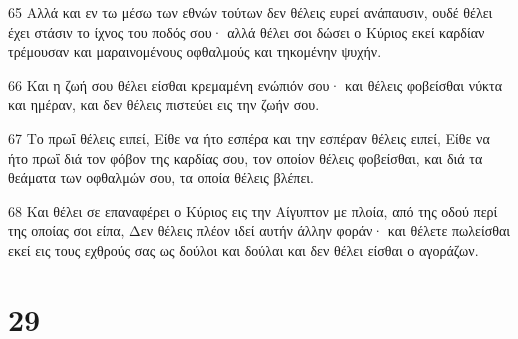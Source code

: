 \par 65 Αλλά και εν τω μέσω των εθνών τούτων δεν θέλεις ευρεί ανάπαυσιν, ουδέ θέλει έχει στάσιν το ίχνος του ποδός σου· αλλά θέλει σοι δώσει ο Κύριος εκεί καρδίαν τρέμουσαν και μαραινομένους οφθαλμούς και τηκομένην ψυχήν.
\par 66 Και η ζωή σου θέλει είσθαι κρεμαμένη ενώπιόν σου· και θέλεις φοβείσθαι νύκτα και ημέραν, και δεν θέλεις πιστεύει εις την ζωήν σου.
\par 67 Το πρωΐ θέλεις ειπεί, Είθε να ήτο εσπέρα και την εσπέραν θέλεις ειπεί, Είθε να ήτο πρωΐ διά τον φόβον της καρδίας σου, τον οποίον θέλεις φοβείσθαι, και διά τα θεάματα των οφθαλμών σου, τα οποία θέλεις βλέπει.
\par 68 Και θέλει σε επαναφέρει ο Κύριος εις την Αίγυπτον με πλοία, από της οδού περί της οποίας σοι είπα, Δεν θέλεις πλέον ιδεί αυτήν άλλην φοράν· και θέλετε πωλείσθαι εκεί εις τους εχθρούς σας ως δούλοι και δούλαι και δεν θέλει είσθαι ο αγοράζων.

\chapter{29}

